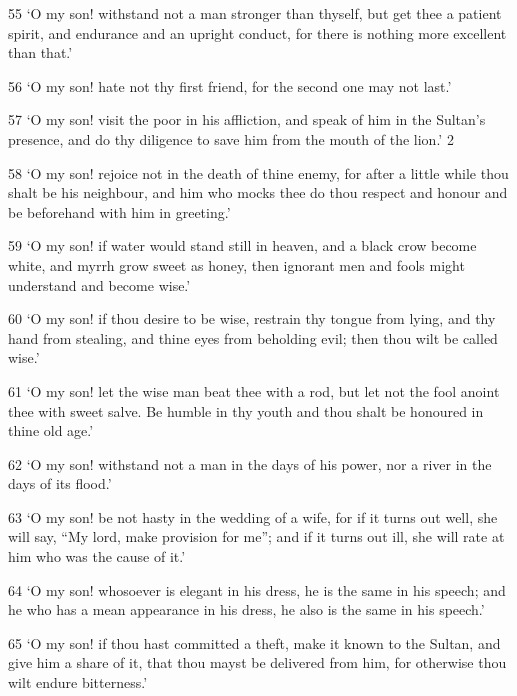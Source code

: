 \par 55 ‘O my son! withstand not a man stronger than thyself, but get thee a patient spirit, and endurance and an upright conduct, for there is nothing more excellent than that.’

\par 56 ‘O my son! hate not thy first friend, for the second one may not last.’

\par 57 ‘O my son! visit the poor in his affliction, and speak of him in the Sultan's presence, and do thy diligence to save him from the mouth of the lion.’ 2

\par 58 ‘O my son! rejoice not in the death of thine enemy, for after a little while thou shalt be his neighbour, and him who mocks thee do thou respect and honour and be beforehand with him in greeting.’

\par 59 ‘O my son! if water would stand still in heaven, and a black crow become white, and myrrh grow sweet as honey, then ignorant men and fools might understand and become wise.’

\par 60 ‘O my son! if thou desire to be wise, restrain thy tongue from lying, and thy hand from stealing, and thine eyes from beholding evil; then thou wilt be called wise.’

\par 61 ‘O my son! let the wise man beat thee with a rod, but let not the fool anoint thee with sweet salve. Be humble in thy youth and thou shalt be honoured in thine old age.’

\par 62 ‘O my son! withstand not a man in the days of his power, nor a river in the days of its flood.’

\par 63 ‘O my son! be not hasty in the wedding of a wife, for if it turns out well, she will say, “My lord, make provision for me”; and if it turns out ill, she will rate at him who was the cause of it.’

\par 64 ‘O my son! whosoever is elegant in his dress, he is the same in his speech; and he who has a mean appearance in his dress, he also is the same in his speech.’

\par 65 ‘O my son! if thou hast committed a theft, make it known to the Sultan, and give him a share of it, that thou mayst be delivered from him, for otherwise thou wilt endure bitterness.’

